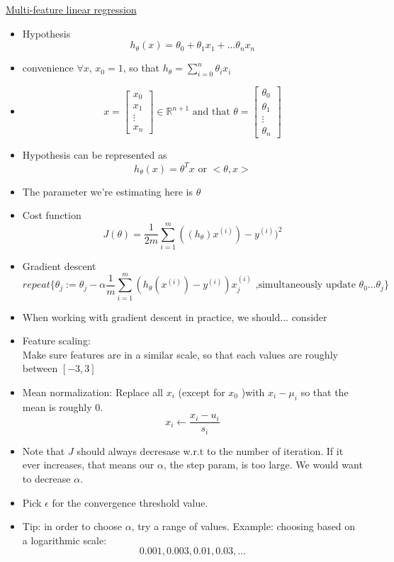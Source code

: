 \documentclass[12pt]{article}
\begin{document}
\underline{Multi-feature linear regression}\\
\begin{itemize}
\item Hypothesis
\[h_\theta (x) = \theta_0+ \theta_1x_1 +\ldots \theta_nx_n\]
\item convenience $\forall x$, $x_0=1$, so that $h_\theta= \sum_{i=0}^{n}\theta_ix_i$
\item 
$$ x= \begin{bmatrix}
	x_0 \\
	x_1 \\
	\vdots \\
	x_n
\end{bmatrix}
 \in \mathbb{R} ^{n+1}
\text{ and that } \theta = \begin{bmatrix}
	\theta_0 \\
	\theta_1 \\
	\vdots \\
	\theta_n
\end{bmatrix}
$$
\item Hypothesis can be represented as
\[h_\theta(x)=\theta^T x \text{ or } <\theta,x>\]
\item The parameter we're estimating here is $\theta$
\item Cost function 
\[J(\theta) = \frac{1}{2m}\sum_{i=1}^{m}((h_\theta)x^{(i)})-y^{(i)})^2\]
\item Gradient descent
\[repeat \{ \theta_j := \theta_j - \alpha\frac{1}{m}\sum_{i=1}^{m} (h_\theta(x^{(i)})-y^{(i)})x_j^{(i)}  \text{ ,simultaneously update }\theta_0\ldots \theta_j\}\]
\item When working with gradient descent in practice, we should... consider
\item Feature scaling:\\
Make sure features are in a similar scale, so that each values are roughly between $[-3,3]$
\item Mean normalization:
Replace all $x_i$ (except for $x_0$ )with $x_i-\mu_i$ so that the mean is roughly $0$.\\
\[x_i\leftarrow \frac{x_i-u_i}{s_i}\]
\item Note that $J$ should always decresase w.r.t to the number of iteration. If it ever increases, that means our $\alpha$, the step param, is too large. We would want to decrease $\alpha$.\\
\item Pick $\epsilon$ for the convergence threshold value.
\item Tip: in order to choose $\alpha$, try a range of values. Example: choosing based on a logarithmic scale: \[0.001,0.003,0.01,0.03,\ldots\]\\

\end{itemize}
\end{document}
